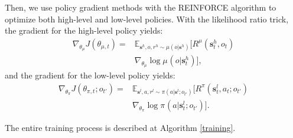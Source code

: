 \documentclass[letterpaper]{article} %
\theoremstyle{definition}
\begin{document}
Then, we use policy gradient methods \cite{sutton2000policy} with the REINFORCE algorithm \cite{williams1992simple} to optimize both high-level and low-level policies. 
With the likelihood ratio trick, the gradient for the high-level policy yields:
%
\begin{equation}\label{gradient_high}
    \begin{split}
        \nabla_{\theta_{\mu}} J(\theta_{{\mu},t}) =& \mathbb{E}_{\mathbf{s}^h,o,r^h \sim \mu(o|\mathbf{s}^h)} [R^\mu(\mathbf{s}_t^h, o_t) \\ & \nabla_{\theta_{\mu}} \log \mu_{}(o|\mathbf{s}_t^h)],
    \end{split} 
\end{equation}
and the gradient for the low-level policy yields: %
\begin{equation}\label{gradient_low}
    \begin{split}
         \nabla_{\theta_{\pi}} J(\theta_{\pi,t};o_{t'}) =& \mathbb{E}_{\mathbf{s}^l,a,r^l \sim \pi(a|\mathbf{s}^l;o_{t'})} [R^\pi(\mathbf{s}_t^l, a_t; o_{t'}) \\ & \nabla_{\theta_{\pi}} \log \pi_{}(a|\mathbf{s}_t^l; o_{t'})].
    \end{split}
\end{equation}


The entire training process is described at Algorithm \ref{training}.
\end{document}
